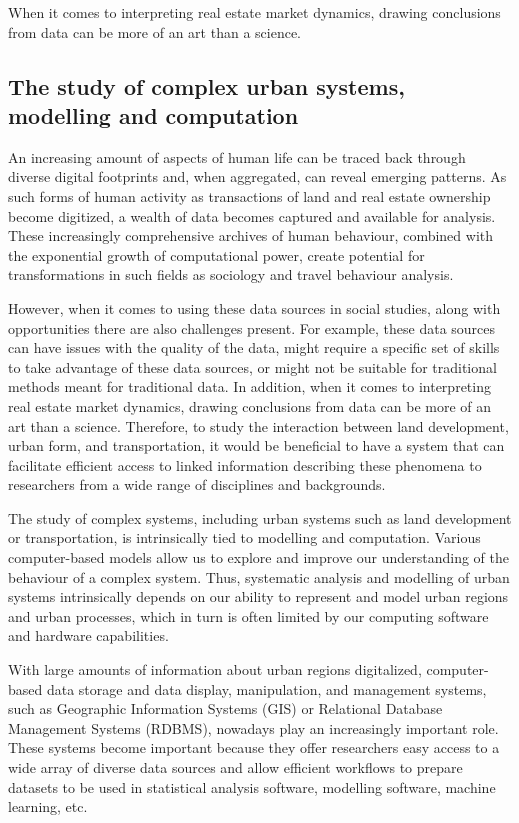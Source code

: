 When it comes to interpreting real estate market dynamics, drawing conclusions from data can be more of an art than a science.\cite{Brett2009}

\subsection{The study of complex urban systems, modelling and computation} \label{subsec:study_of_complex_urban_systems_modelling_computation}

An increasing amount of aspects of human life can be traced back through diverse digital footprints and, when aggregated, can reveal emerging patterns.\cite{Arribas-Bel2014}
As such forms of human activity as transactions of land and real estate ownership become digitized\cite{TeranetEnterprisesInc.}, a wealth of data becomes captured and available for analysis.
These increasingly comprehensive archives of human behaviour, combined with the exponential growth of computational power, create potential for transformations in such fields as sociology\cite{Lazer2017} and travel behaviour analysis\cite{Chen2016}.

However, when it comes to using these data sources in social studies, along with opportunities there are also challenges present.
For example, these data sources can have issues with the quality of the data, might require a specific set of skills to take advantage of these data sources, or might not be suitable for traditional methods meant for traditional data\cite{Arribas-Bel2014}.
In addition, when it comes to interpreting real estate market dynamics, drawing conclusions from data can be more of an art than a science.\cite{Brett2009}
Therefore, to study the interaction between land development, urban form, and transportation, it would be beneficial to have a system that can facilitate efficient access to linked information describing these phenomena to researchers from a wide range of disciplines and backgrounds.

The study of complex systems, including urban systems such as land development or transportation, is intrinsically tied to modelling and computation.
Various computer-based models allow us to explore and improve our understanding of the behaviour of a complex system.
Thus, systematic analysis and modelling of urban systems intrinsically depends on our ability to represent and model urban regions and urban processes, which in turn is often limited by our computing software and hardware capabilities.

With large amounts of information about urban regions digitalized\cite{TeranetEnterprisesInc.}, computer-based data storage and data display, manipulation, and management systems, such as Geographic Information Systems (GIS) or Relational Database Management Systems (RDBMS), nowadays play an increasingly important role.
These systems become important because they offer researchers easy access to a wide array of diverse data sources and allow efficient workflows to prepare datasets to be used in statistical analysis software, modelling software, machine learning, etc.


